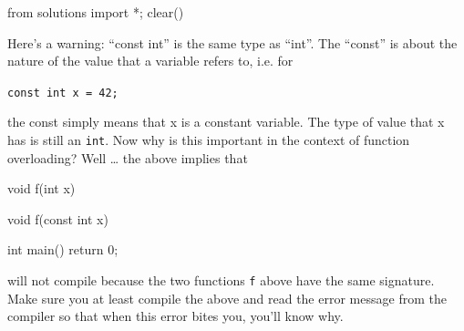\begin{python0}
from solutions import *; clear()
\end{python0}

Here's a warning: ``const int'' is the same type as ``int''. The ``const'' is about the nature of the value that a variable refers to, i.e. for

\verb!const int x = 42;!

the const simply means that x is a constant variable. The type of value that x has is still an \texttt{int}. Now why is this important in the context of function overloading? Well \ldots{} the above implies that

\begin{consolethree}[escapeinside=||]
void f(int x)
{
}

void f(const int x)
{
}

int main()
{
    return 0;
}
\end{consolethree}

will not compile because the two functions \texttt{f} above have the same signature. Make sure you at least compile the above and read the error message from the compiler so that when this error bites you, you'll know why.



